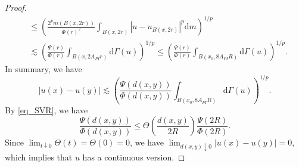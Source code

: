 \documentclass[11pt,a4paper]{article}
\numberwithin{equation}{section}
\theoremstyle{plain}
\theoremstyle{definition}
\begin{document}
\begin{proof}
\begin{align*}
&\le\left(\frac{2^pm(B(x,2r))}{\Phi(r)^2}\int_{B(x,2r)}|u-u_{B(x,2r)}|^p\mathrm{d} m\right)^{1/p}\\
&\lesssim\left(\frac{\Psi(r)}{\Phi(r)}\int_{B(x,2A_{PI}r)}\mathrm{d}\Gamma(u)\right)^{1/p}\le\left(\frac{\Psi(r)}{\Phi(r)}\int_{B(x_0,8A_{PI}R)}\mathrm{d}\Gamma(u)\right)^{1/p}.
\end{align*}
In summary, we have
$$|u(x)-u(y)|\lesssim\left(\frac{\Psi(d(x,y))}{\Phi(d(x,y))}\int_{B(x_0,8A_{PI}R)}\mathrm{d}\Gamma(u)\right)^{1/p}.$$
By \ref{eq_SVR}, we have
$$\frac{\Psi(d(x,y))}{\Phi(d(x,y))}\le\Theta \left(\frac{d(x,y)}{2R}\right)\frac{\Psi(2R)}{\Phi(2R)}.$$
Since $\lim_{t\downarrow0}\Theta(t)=\Theta(0)=0$, we have $\lim_{d(x,y)\downarrow0}|u(x)-u(y)|=0$, which implies that $u$ has a continuous version.
\end{proof}
\end{document}
